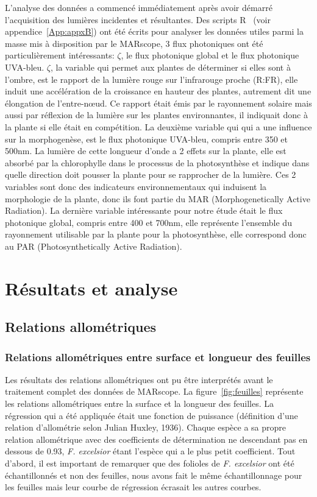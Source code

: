 \documentclass[12pt]{report}
\begin{document}
L'analyse des données a commencé immédiatement après avoir démarré
l'acquisition des lumières incidentes et résultantes.
Des scripts R~\citep{R_ref38} (voir appendice~\ref{App:appxB}) ont été écrits pour
analyser les données utiles parmi la masse mis à disposition par le
MARscope, 3 flux photoniques ont été particulièrement intéressants: $\zeta$, le flux
photonique global et le flux photonique UVA-bleu. $\zeta$, la variable qui
permet aux plantes de déterminer si elles sont à l'ombre, est le rapport de
la lumière rouge sur l'infrarouge proche (R:FR), elle
induit une accélération de la croissance en hauteur des plantes, autrement dit
une élongation de l'entre-n\oe{}ud. Ce rapport était émis par le rayonnement
solaire mais aussi par réflexion de la lumière sur les plantes environnantes, il
indiquait donc à la plante si elle était en compétition. La deuxième variable qui
qui a une influence sur la morphogenèse, est le flux photonique UVA-bleu,
compris entre 350 et 500nm. La lumière de cette longueur d'onde a 2 effets sur
la plante, elle est absorbé par la chlorophylle dans le processus de la
photosynthèse et indique dans quelle
direction doit pousser la plante pour se rapprocher de la lumière. Ces 2
variables sont donc des indicateurs environnementaux qui induisent la
morphologie de la plante, donc ils font partie du MAR (Morphogenetically Active
Radiation). La dernière variable intéressante pour notre étude était le flux
photonique global, compris entre 400 et 700nm, elle représente l'ensemble du rayonnement
utilisable par la plante pour la photosynthèse, elle correspond donc au PAR
(Photosynthetically Active Radiation).



\chapter{Résultats et analyse}


\section{Relations allométriques}

\subsection{Relations allométriques entre surface et longueur des feuilles}

Les résultats des relations allométriques ont pu être interprétés avant
le traitement complet des données de MARscope. La figure~\ref{fig:feuilles}
représente les relations allométriques entre la surface et la longueur des
feuilles. La régression qui a été appliquée était une
fonction de puissance (définition d'une relation d'allométrie selon Julian
Huxley, 1936). Chaque espèce a sa propre relation allométrique avec des
coefficients de détermination ne descendant pas en dessous de 0.93, \textit{
F. excelsior} étant l'espèce qui a le plus petit coefficient. Tout d'abord, il
est important de remarquer que des folioles de \textit{F. excelsior} ont été
échantillonnés et non des feuilles, nous avons fait le même échantillonnage pour
les feuilles mais leur courbe de régression écrasait les autres courbes.
\end{document}
